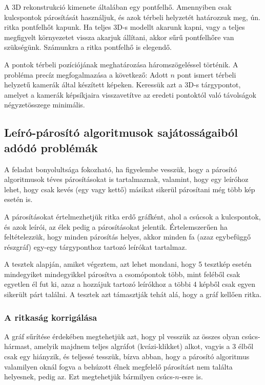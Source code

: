 \documentclass{article}
\begin{document}
	A 3D rekonstrukció kimenete általában egy pontfelhő. Amennyiben csak kulcspontok párosítását használjuk, és azok térbeli helyzetét határozzuk meg, ún. ritka pontfelhőt kapunk. Ha teljes 3D-s modellt akarunk kapni, vagy a teljes megfigyelt környezetet vissza akarjuk állítani, akkor sűrű pontfelhőre van szükségünk. Számunkra a ritka pontfelhő is elegendő.
	
	A pontok térbeli pozíciójának meghatározása háromszögeléssel történik. A probléma precíz megfogalmazása a következő: Adott $n$ pont ismert térbeli helyzetű kamerák által készített képeken. Keressük azt a 3D-s tárgypontot, amelyet a kamerák képsíkjaira visszavetítve az eredeti pontoktól való távolságok négyzetösszege minimális.

	\subsection{Leíró-párosító algoritmusok sajátosságaiból adódó problémák}
	A feladat bonyolultsága fokozható, ha figyelembe vesszük, hogy a párosító algoritmusok téves párosításokat is tartalmaznak, valamint, hogy egy leíróhoz lehet, hogy csak kevés (egy vagy kettő) másikat sikerül párosítani még több kép esetén is.
	
	A párosításokat értelmezhetjük ritka erdő gráfként, ahol a csúcsok a kulcspontok, és azok leírói, az élek pedig a párosításokat jelentik. Értelemszerűen ha feltételezzük, hogy minden párosítás helyes, akkor minden fa (azaz egybefüggő részgráf) egy-egy tárgyponthoz tartozó leírókat tartalmaz. 
	
	A tesztek alapján, amiket végeztem, azt lehet mondani, hogy 5 tesztkép esetén mindegyiket mindegyikkel párosítva a csomópontok több, mint feléből csak egyetlen él fut ki, azaz a hozzájuk tartozó leírókhoz a többi 4 képből csak egyen sikerült párt találni. A tesztek azt támasztják tehát alá, hogy a gráf kellően ritka.
	
	\subsubsection{A ritkaság korrigálása}
	\label{extension_doc}
	A gráf sűrítése érdekében megtehetjük azt, hogy pl vesszük az összes olyan csúcs-hármast, amelyik majdnem teljes algráfot (kvázi-klikket) alkot, vagyis a 3 élből csak egy hiányzik, és teljessé tesszük, bízva abban, hogy a párosító algoritmus valamilyen oknál fogva a behúzott élnek megfelelő párosítást nem találta helyesnek, pedig az. Ezt megtehetjük bármilyen csúcs-$n$-esre is.
	
\end{document}
